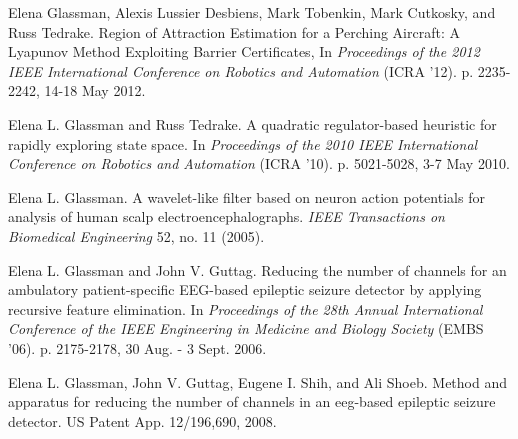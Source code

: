 \documentclass[margin]{res}
\begin{document}
\begin{resume}

Elena Glassman, Alexis Lussier Desbiens, Mark Tobenkin, Mark Cutkosky, and Russ Tedrake. Region of Attraction Estimation for a Perching Aircraft: A Lyapunov Method Exploiting Barrier Certificates, In {\it Proceedings of the 2012 IEEE International Conference on Robotics and Automation} (ICRA '12). p. 2235-2242, 14-18 May 2012.


Elena L. Glassman and Russ Tedrake. A quadratic regulator-based heuristic for rapidly exploring state space. In {\it Proceedings of the 2010 IEEE International Conference on Robotics and Automation} (ICRA '10). p. 5021-5028, 3-7 May 2010. 

 
Elena L. Glassman. A wavelet-like filter based on neuron action potentials for analysis of human scalp electroencephalographs. \textit{IEEE Transactions on Biomedical Engineering} 52, no. 11 (2005).

Elena L. Glassman and John V. Guttag. Reducing the number of channels for an ambulatory patient-specific EEG-based epileptic seizure detector by applying recursive feature elimination. In \textit{Proceedings of the 28th Annual International Conference of the IEEE Engineering in Medicine and Biology Society} (EMBS '06). p. 2175-2178, 30 Aug. - 3 Sept. 2006.

Elena L. Glassman, John V. Guttag, Eugene I. Shih, and Ali Shoeb. Method and apparatus for reducing the number of channels in an eeg-based epileptic seizure detector. US Patent App. 12/196,690, 2008.


\end{resume}
\end{document}
